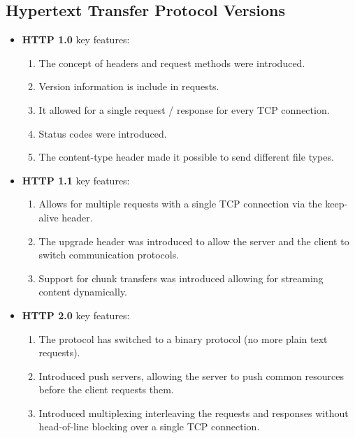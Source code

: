 \documentclass{article}
\begin{document}
    \subsection*{Hypertext Transfer Protocol Versions}
    \begin{itemize}
        \item \textbf{HTTP 1.0} key features:
        \begin{enumerate}
            \item The concept of headers and request methods were introduced.
            \item Version information is include in requests.
            \item It allowed for a single request / response for every TCP connection.
            \item Status codes were introduced.
            \item The content-type header made it possible to send different file types.
        \end{enumerate}
        \item \textbf{HTTP 1.1} key features:
        \begin{enumerate}
            \item Allows for multiple requests with a single TCP connection via the keep-alive header.
            \item The upgrade header was introduced to allow the server and the client to switch communication protocols.
            \item Support for chunk transfers was introduced allowing for streaming content dynamically.
        \end{enumerate}
        \item \textbf{HTTP 2.0} key features:
        \begin{enumerate}
            \item The protocol has switched to a binary protocol (no more plain text requests).
            \item Introduced push servers, allowing the server to push common resources before the client requests them.
            \item Introduced multiplexing interleaving the requests and responses without head-of-line blocking over a single TCP connection.
        \end{enumerate}
    \end{itemize}
\end{document}
